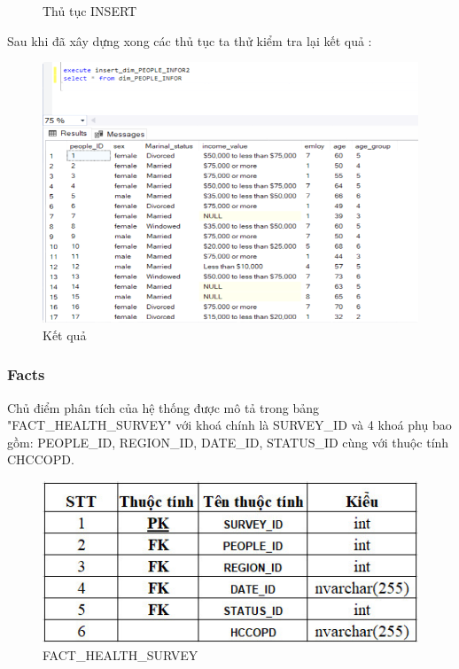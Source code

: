 \begin{itemize}
\begin{center}
\begin{figure}[!h]
              \caption{Thủ tục INSERT}
            \end{figure}
\end{center}
Sau khi đã xây dựng xong các thủ tục ta thử kiểm tra lại kết quả :
\begin{center}
            \begin{figure}[!h]
                \centering
                \includegraphics[scale = 0.75]{HONG/10.png} 
              \caption{Kết quả}
            \end{figure}
\end{center}
\end{itemize}
\newpage
\subsubsection{Facts}
Chủ điểm phân tích của hệ thống được mô tả trong bảng "FACT\_HEALTH\_SURVEY" với khoá chính là SURVEY\_ID và 4 khoá phụ bao gồm: PEOPLE\_ID, REGION\_ID, DATE\_ID, STATUS\_ID cùng với thuộc tính CHCCOPD.
\begin{center}
            \begin{figure}[!h]
                \centering
                \includegraphics[scale = 0.9]{van/fact.png} 
              \caption{FACT\_HEALTH\_SURVEY}
            \end{figure}
\end{center}

